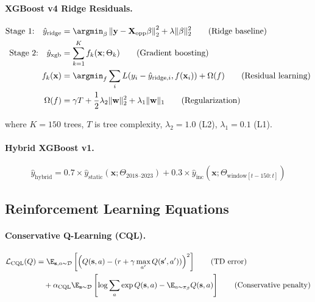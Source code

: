\paragraph{XGBoost v4 Ridge Residuals.}
\begin{align}
\text{Stage 1:} \quad \hat{y}_{\text{ridge}} &= \argmin_{\beta} \left\| \mathbf{y} - \mathbf{X}_{\text{opp}} \beta \right\|_2^2 + \lambda \|\beta\|_2^2 \tag{Ridge baseline} \\
\text{Stage 2:} \quad \hat{y}_{\text{xgb}} &= \sum_{k=1}^K f_k(\mathbf{x}; \Theta_k) \tag{Gradient boosting} \\
f_k(\mathbf{x}) &= \argmin_f \sum_i L(y_i - \hat{y}_{\text{ridge},i}, f(\mathbf{x}_i)) + \Omega(f) \tag{Residual learning} \\
\Omega(f) &= \gamma T + \frac{1}{2} \lambda_2 \|\mathbf{w}\|_2^2 + \lambda_1 \|\mathbf{w}\|_1 \tag{Regularization}
\end{align}

\noindent where $K = 150$ trees, $T$ is tree complexity, $\lambda_2 = 1.0$ (L2), $\lambda_1 = 0.1$ (L1).

\paragraph{Hybrid XGBoost v1.}
\begin{equation}
\hat{y}_{\text{hybrid}} = 0.7 \times \hat{y}_{\text{static}}(\mathbf{x}; \Theta_{\text{2018--2023}}) + 0.3 \times \hat{y}_{\text{inc}}(\mathbf{x}; \Theta_{\text{window}[t-150:t]})
\end{equation}

\subsection{Reinforcement Learning Equations}

\paragraph{Conservative Q-Learning (CQL).}
\begin{align}
\mathcal{L}_{\text{CQL}}(Q) &= \E_{\mathbf{s}, a \sim \mathcal{D}} \left[ \left( Q(\mathbf{s}, a) - (r + \gamma \max_{a'} Q(\mathbf{s}', a')) \right)^2 \right] \tag{TD error} \\
&\quad + \alpha_{\text{CQL}} \E_{\mathbf{s} \sim \mathcal{D}} \left[ \log \sum_a \exp Q(\mathbf{s}, a) - \E_{a \sim \pi_\beta} Q(\mathbf{s}, a) \right] \tag{Conservative penalty}
\end{align}

